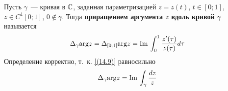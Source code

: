 \Def
Пусть $\gamma$~--- кривая в $\mathbb{C}$, заданная параметризацией $z=z(t)$, $t \in
[0;1]$, $z \in C^1[0;1]$, $0 \not \in \gamma$. Тогда \textbf{приращением
  аргумента $z$ вдоль кривой $\gamma$} называется
\begin{equation}\label{(14.9)}
    \Delta_{\gamma}\mathrm{arg} z = \Delta_{[0;1]}\mathrm{arg} z = \mathrm{Im}\, \int_{0}^1 \frac{z'(\tau)}{z(\tau)}d \tau
\end{equation}
Определение корректно, т.~к. \eqref{(14.9)} равносильно
\begin{equation}\label{(14.10)}
    \Delta_{\gamma}\mathrm{arg} z = \mathrm{Im}\, \int_{\gamma} \frac{dz}{z}
\end{equation}
